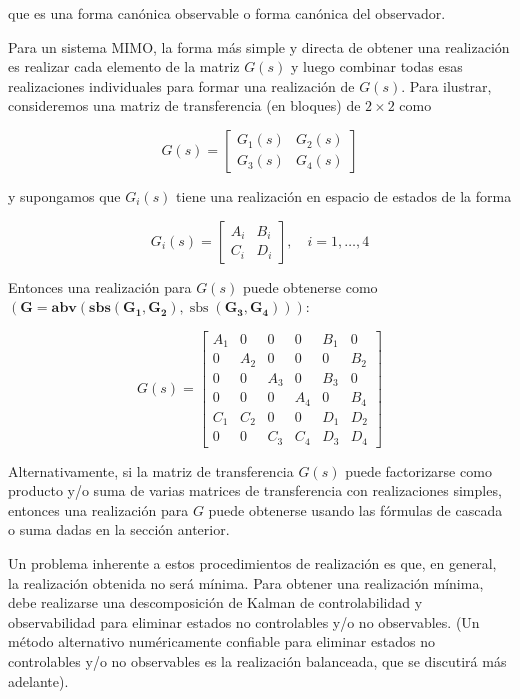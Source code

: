 que es una forma canónica observable o forma canónica del observador.

Para un sistema MIMO, la forma más simple y directa de obtener una realización es realizar cada elemento de la matriz $G(s)$ y luego combinar todas esas realizaciones individuales para formar una realización de $G(s)$. Para ilustrar, consideremos una matriz de transferencia (en bloques) de $2 \times 2$ como

$$
G(s)=\left[\begin{array}{ll}
G_{1}(s) & G_{2}(s) \\
G_{3}(s) & G_{4}(s)
\end{array}\right]
$$

y supongamos que $G_{i}(s)$ tiene una realización en espacio de estados de la forma

$$
G_{i}(s)=\left[\begin{array}{c|c}
A_{i} & B_{i} \\
\hline C_{i} & D_{i}
\end{array}\right], \quad i=1, \ldots, 4
$$

Entonces una realización para $G(s)$ puede obtenerse como $(\mathbf{G}=\mathbf{abv}(\mathbf{sbs}(\mathbf{G}_{\mathbf{1}}, \mathbf{G}_{\mathbf{2}}), \operatorname{sbs}(\mathbf{G}_{\mathbf{3}}, \mathbf{G}_{\mathbf{4}})))$:

$$
G(s)=\left[\begin{array}{cccc|cc}
A_{1} & 0 & 0 & 0 & B_{1} & 0 \\
0 & A_{2} & 0 & 0 & 0 & B_{2} \\
0 & 0 & A_{3} & 0 & B_{3} & 0 \\
0 & 0 & 0 & A_{4} & 0 & B_{4} \\
\hline C_{1} & C_{2} & 0 & 0 & D_{1} & D_{2} \\
0 & 0 & C_{3} & C_{4} & D_{3} & D_{4}
\end{array}\right]
$$

Alternativamente, si la matriz de transferencia $G(s)$ puede factorizarse como producto y/o suma de varias matrices de transferencia con realizaciones simples, entonces una realización para $G$ puede obtenerse usando las fórmulas de cascada o suma dadas en la sección anterior.

Un problema inherente a estos procedimientos de realización es que, en general, la realización obtenida no será mínima. Para obtener una realización mínima, debe realizarse una descomposición de Kalman de controlabilidad y observabilidad para eliminar estados no controlables y/o no observables. (Un método alternativo numéricamente confiable para eliminar estados no controlables y/o no observables es la realización balanceada, que se discutirá más adelante).

